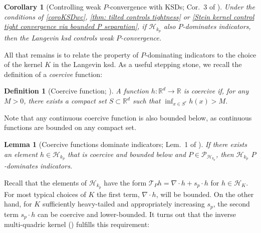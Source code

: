 \documentclass[12pt,paper=letter]{scrreprt}
\newtheorem{lemma}[theorem]{Lemma}
\newtheorem{corollary}[theorem]{Corollary}
\newtheorem{definition}{Definition}[chapter]
\def\R{\mathbb{R}}
\begin{document}
\begin{corollary}[Controlling weak $P$-convergence with KSDs; Cor.~3 of \citealp{barp2022targeted}]\label{ksd-tightness}
Under the conditions of \cref{coroKSDwc}, \cref{thm: tilted controls tightness} or \ref{Stein kernel control tight convergence via bounded P separation}, if $\mathcal{H}_{k_p}$ also $P$-dominates indicators, then the Langevin \ac{ksd} controls weak $P$-convergence.
\end{corollary}

All that remains is to relate the property of $P$-dominating indicators to the choice of the kernel $K$ in the Langevin \ac{ksd}.
As a useful stepping stone, we recall the definition of a \emph{coercive} function:


\begin{definition}[Coercive function; \citealp{hodgkinson2020reproducing}]
A function $h :\mathbb{R}^d \to \R$ is \emph{coercive} if, for any $M >0$, there exists a compact set $S \subset \mathbb{R}^d$ such that
$\inf_{x \in S^c} h(x) > M$.
\end{definition}

\noindent Note that any continuous coercive function is also bounded below, as continuous functions are bounded on any compact set.





\begin{lemma}[Coercive functions dominate indicators; Lem.~1 of \citealp{barp2022targeted}] \label{coercive-tightness}
If there exists an element $h\in \mathcal{H}_{k_p}$ that is coercive and bounded below and $P \in \mathcal{P}_{\mathcal{H}_{k_p}}$, then $\mathcal{H}_{k_p}$ $P$-dominates indicators.
\end{lemma}


Recall that the elements of $\mathcal{H}_{k_p}$ have the form $\mathcal{T}_P h = \nabla \cdot h + s_p \cdot h$ for $h \in \mathcal{H}_K$.
For most typical choices of $K$ the first term, $\nabla \cdot h$, will be bounded.
On the other hand, for $K$ sufficiently heavy-tailed and appropriately increasing $s_p$, the second term $s_p \cdot h$ can be coercive and lower-bounded.
It turns out that the inverse multi-quadric kernel () fulfills this requirement:
\end{document}
